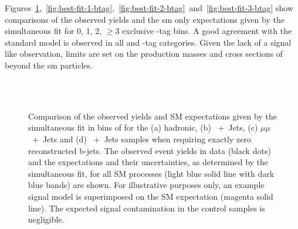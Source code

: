Figures~\ref{fig:best-fit-0-btag},~\ref{fig:best-fit-1-btag},~\ref{fig:best-fit-2-btag}~and~\ref{fig:best-fit-3-btag} show comparisons of the observed yields 
and the \ac{sm} only expectations given by the simultaneous fit for 0, 
1, 2, $\ge3$ exclusive \Pbottom-tag bins. A good agreement with the standard 
model is observed in all \HT and \Pbottom-tag categories. Given the lack of a 
signal like observation, limits are set on the production masses and cross 
sections of beyond the \ac{sm} particles. 

\begin{figure}[h!]
  \begin{center}
     \\
     \\
    \caption{\label{fig:best-fit-0-btag} Comparison of the observed
      yields and SM expectations given by the simultaneous fit in bins
      of \HT for the (a) hadronic, (b) \Pmu~+~Jets, (c)
      $\mu\mu$~+~Jets and (d) \Pphoton~+~Jets
      samples when requiring exactly zero reconstructed
      b-jets. The observed event yields in data (black dots) and the
      expectations and their uncertainties, as determined by the
      simultaneous fit, for all SM processes (light blue solid line
      with dark blue bands) are shown. For illustrative purposes only,
      an example signal model is superimposed on the SM expectation
      (magenta solid line). The expected signal contamination in the
      control samples is negligible.} 
  \end{center}
\end{figure}



